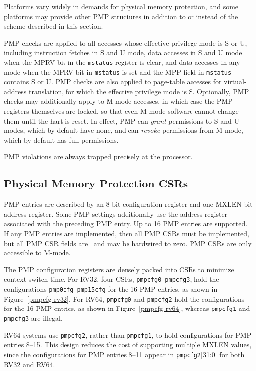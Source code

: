 \begin{commentary}
Platforms vary widely in demands for physical memory protection, and
some platforms may provide other PMP structures in addition to or
instead of the scheme described in this section.
\end{commentary}

PMP checks are applied to all accesses whose effective privilege mode is S or
U, including instruction fetches in S and U mode, data accesses in S and
U mode when the MPRV bit in the {\tt mstatus} register is clear, and data
accesses in any mode when the MPRV bit in {\tt mstatus} is set and the MPP
field in {\tt mstatus} contains S or U.
PMP checks are also applied to page-table
accesses for virtual-address translation, for which the effective
privilege mode is S.  Optionally, PMP checks may additionally apply
to M-mode accesses, in which case the PMP registers themselves are
locked, so that even M-mode software cannot change them until the hart is
reset.  In effect, PMP can {\em grant} permissions to S and U
modes, which by default have none, and can {\em revoke} permissions
from M-mode, which by default has full permissions.

PMP violations are always trapped precisely at the processor.

\subsection{Physical Memory Protection CSRs}

PMP entries are described by an 8-bit configuration register and one MXLEN-bit
address register.  Some PMP settings additionally use the address register
associated with the preceding PMP entry.  Up to 16 PMP entries are supported.
If any PMP entries are implemented, then all PMP CSRs must be implemented,
but all PMP CSR fields are \warl\ and may be hardwired to zero.  PMP CSRs
are only accessible to M-mode.

The PMP configuration registers are densely packed into CSRs to minimize
context-switch time.  For RV32, four CSRs, {\tt pmpcfg0}--{\tt pmpcfg3}, hold
the configurations {\tt pmp0cfg}--{\tt pmp15cfg} for the 16 PMP entries, as
shown in Figure~\ref{pmpcfg-rv32}.  For RV64, {\tt pmpcfg0} and {\tt pmpcfg2}
hold the configurations for the 16 PMP entries, as shown in
Figure~\ref{pmpcfg-rv64}, whereas {\tt pmpcfg1} and {\tt pmpcfg3} are illegal.

\begin{commentary}
RV64 systems use {\tt pmpcfg2}, rather than {\tt pmpcfg1}, to hold
configurations for PMP entries 8--15.  This design reduces the cost of
supporting multiple MXLEN values, since the configurations for PMP
entries 8--11 appear in {\tt pmpcfg2}[31:0] for both RV32 and RV64.
\end{commentary}

